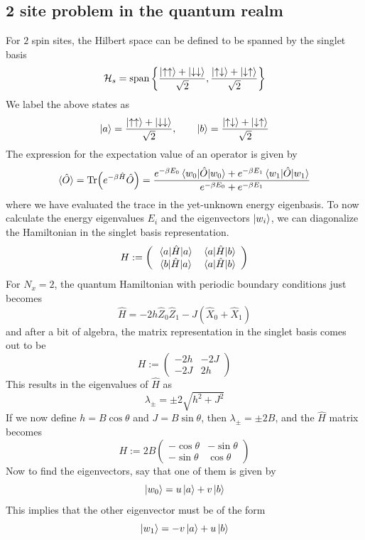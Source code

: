 \documentclass[../thesis_main.tex]{subfiles}
\begin{document}
\subsection{2 site problem in the quantum realm}
For $2$ spin sites, the Hilbert space can be defined to be spanned by the singlet basis
\[
    \mathcal{H}_s = \text{span} \left\{\frac{\ket{\uparrow \uparrow} + \ket{\downarrow\downarrow}}{\sqrt{2}}, \frac{\ket{\uparrow\downarrow} + \ket{\downarrow\uparrow}}{\sqrt{2}} \right\}
\]   
We label the above states as 
\[ \ket{a} = \frac{\ket{\uparrow \uparrow} + \ket{\downarrow\downarrow}}{\sqrt{2}}, \qquad \ket{b} = \frac{\ket{\uparrow\downarrow} + \ket{\downarrow\uparrow}}{\sqrt{2}}\]
The expression for the expectation value of an operator is given by 
\[
    \langle{\hat{O}}\rangle = \Tr(e^{-\beta \hat{H}} \hat{O}) = \frac{e^{-\beta E_0}\mel{w_0}{\hat{O}}{w_0} + e^{-\beta E_1}\mel{w_1}{\hat{O}}{w_1}}{e^{-\beta  E_0} + e^{-\beta E_1}}
\]
where we have evaluated the trace in the yet-unknown energy eigenbasis. To now calculate the energy eigenvalues $E_i$ and the eigenvectors $\ket{w_i}$, we can diagonalize the Hamiltonian in the singlet basis representation.
\[
    H := \left(\begin{array}{cc}
    \mel{a}{\hat{H}}{a} & \mel{a}{\hat{H}}{b} \\ 
    \mel{b}{\hat{H}}{a} & \mel{a}{\hat{H}}{b}
    \end{array}\right)
\]  
For $N_x = 2$, the quantum Hamiltonian with periodic boundary conditions just becomes
\[
    \hat{H} = - 2h \hat{Z}_0 \hat{Z}_1 - J(\hat{X}_0 + \hat{X}_1)
\] 
and after a bit of algebra, the matrix representation in the singlet basis comes out to be
\[
    H:= \left(\begin{array}{cc}
    -2h & -2J \\ 
    -2J & 2h
    \end{array}\right)
\]
This results in the eigenvalues of $\hat{H}$ as 
\[
    \lambda_\pm = \pm 2 \sqrt{h^2 + J^2}
\]
If we now define $\boxed{h = B \cos \theta}$ and $\boxed{J = B \sin \theta}$, then $\lambda_\pm = \pm 2B$, and the $\hat{H}$ matrix becomes
\[
    H := 2B \left(\begin{array}{cc}
    -\cos \theta  & -\sin \theta  \\ 
    -\sin \theta  & \cos \theta 
    \end{array}\right)
\]   
Now to find the eigenvectors, say that one of them is given by 
\[
    \ket{w_0} = u \ket{a} + v \ket{b}
\] 
This implies that the other eigenvector must be of the form
\[
    \ket{w_1} = -v \ket{a} + u \ket{b}
\]
\end{document}
